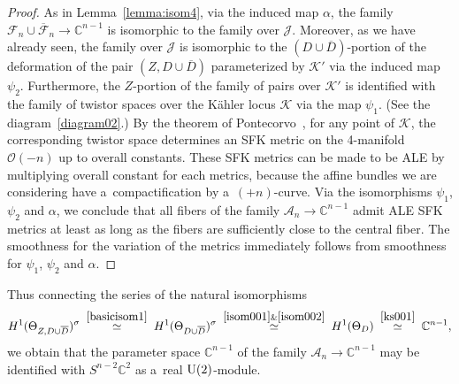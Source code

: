 \documentclass[11pt]{article}
\numberwithin{equation}{section}
\begin{document}
\begin{proof}
As in Lemma~\ref{lemma:isom4}, via the induced map $\alpha$, the family $\mathscr F_n\cup\overline{\mathscr
F}_n\to\mathbb{C}^{n-1}$ is isomorphic to the family over $\mathscr J$.
Moreover, as we have already seen, the family over $\mathscr J$ is isomorphic to the $(D\cup\overline D)$-portion of the
deformation of the pair $(Z,D\cup\overline D)$ parameterized by $\mathscr K'$ via the induced map $\psi_2$.
Furthermore, the $Z$-portion of the family of pairs over $\mathscr K'$ is identif\/ied with the family of twistor spaces
over the K\"ahler locus $\mathscr K$ via the map $\psi_1$.
(See the diagram~\eqref{diagram02}.) By the theorem of Pontecorvo~\cite{Pont92}, for any point of $\mathscr K$, the
corresponding twistor space determines an SFK metric on the 4-manifold $\mathscr O(-n)$ up to overall constants.
These SFK metrics can be made to be ALE by multiplying overall constant for each metrics, because the af\/f\/ine bundles
we are considering have a~compactif\/ication by a~$(+n)$-curve.
Via the isomorphisms $\psi_1$, $\psi_2$ and $\alpha$, we conclude that all f\/ibers of the family $\mathscr
A_n\to\mathbb{C}^{n-1}$ admit ALE SFK metrics at least as long as the f\/ibers are suf\/f\/iciently close to the central f\/iber.
The smoothness for the variation of the metrics immediately follows from smoothness for $\psi_1$, $\psi_2$ and $\alpha$.
\end{proof}
\setcounter{section}{3}
\setcounter{subsection}{2}
\setcounter{subsubsection}{0}
\setcounter{Theorem}{7}
\setcounter{equation}{15}
\setcounter{equation}{13}
Thus connecting the series of the natural isomorphisms
\begin{gather}
\label{isom49}
H^1(\Theta_{Z,D\cup\overline D})^{\sigma}
\; \stackrel{\eqref{basicisom1}}{\simeq}
\;
H^1(\Theta_{D\cup\overline D})^{\sigma}
\; \stackrel{\eqref{isom001}\&\eqref{isom002}}{\simeq}
\;
H^1(\Theta_D)
\;\stackrel{\eqref{ks001}}{\simeq}
\;
\mathbb{C}^{n-1},
\end{gather}
we obtain that the parameter space $\mathbb{C}^{n-1}$ of the family $\mathscr A_n\to\mathbb{C}^{n-1}$ may be
identif\/ied with $S^{n-2}\mathbb{C}^2$ as a~real ${\rm{U}}(2)$-module.
\end{document}
